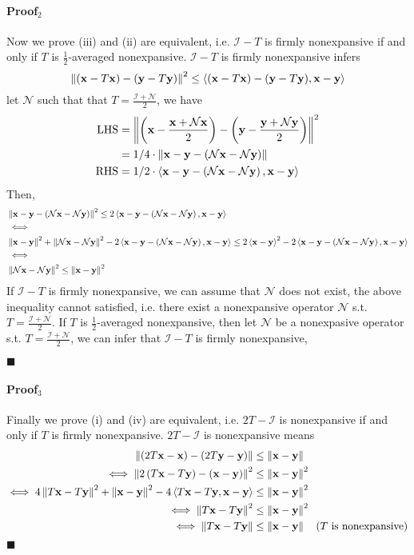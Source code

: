 \documentclass[11pt]{article}
\def\ny{\mathcal N \bold y}
\def\nx{\mathcal N \bold x}
\def\bx{\bold x}
\def\by{\bold y}
\def\tx{T \bold x}
\def\ty{T \bold y}
\newcommand\norm[1]{\left\lVert#1\right\rVert}
\newcommand\vc[1]{\left\langle{#1}\right\rangle }
\newcommand*{\QEDA}{\hfill\ensuremath{\blacksquare}}
\newcommand\bra[1]{\left( #1 \right)}
\def \xy{\norm{\bx - \by}^2}
\def \txty{\norm{\tx  - \ty}^2}
\def \tt{\tx - \ty}
\def \xx{\bx - \by}
\begin{document}
\paragraph{Proof$_2$} Now we prove (iii) and (ii) are equivalent, i.e. $\mathcal I- T$ is firmly nonexpansive if and only if   $T$ is $\frac{1}{2}$-averaged nonexpansive.  $\mathcal I- T$  is firmly nonexpansive infers
$$
\norm{(\bx - \tx) - (\by - \ty)} ^ 2 \leq \vc{(\bx - \tx) - (\by - \ty), \bx - \by}
$$
let $\mathcal N$ such that that $T = \frac{\mathcal I + \mathcal N }{2}$, we have
$$
\begin{aligned}
	\text{LHS}&=\norm{\bra{\bx - \frac{\bx + \nx}{2} } - \bra{\by - \frac{\by + \ny}{2}}}^2\\
	&= 1/4 \cdot \norm {\bx - \by - \bra{\nx - \ny}}\\
	\text{RHS}&= 1/2 \cdot \vc{\bx - \by - \bra {\nx - \ny},\bx - \by}
\end{aligned}
$$
Then,
$$
 \begin{aligned}
 	&\norm {\bx - \by - \bra{\nx - \ny}}^2  \leq  2 \vc{\bx - \by - \bra {\nx - \ny},\bx - \by} \\
 	&\iff  \\
 	 &\norm{\bx - \by}^2  + \norm{\nx - \ny}^2  - 2 \vc{\bx - \by - \bra {\nx - \ny},\bx - \by} \leq  2 \vc{\bx - \by}^2 - 2 \vc{\bx - \by - \bra {\nx - \ny},\bx - \by} \\
 	& \iff \\
 	& \norm{\nx - \ny}^2 \leq  \xy 
 \end{aligned}
$$
If  $\mathcal I- T$ is firmly nonexpansive, we can assume that $\mathcal N$ does not exist, the above inequality cannot satisfied, i.e. there exist a nonexpansive operator $\mathcal N$ s.t.  $T = \frac{\mathcal I + \mathcal N }{2}$. If  $T$ is $\frac{1}{2}$-averaged nonexpansive, then let $\mathcal N$ be a nonexpasive operator s.t. $T = \frac{\mathcal I + \mathcal N }{2}$, we can infer that  $\mathcal I- T$ is firmly nonexpansive,

\QEDA
\paragraph{Proof$_3$} Finally we prove (i) and (iv) are equivalent, i.e. $2 T-\mathcal{I}$ is nonexpansive if and only if  $T$ is firmly nonexpansive. $2 T-\mathcal{I}$ is nonexpansive means 
$$
\begin{aligned}
	\norm{\bra{2\tx  - \bx}- \bra {2\ty  - \by}} &\leq  \norm{\bx - \by}\\
	\iff \norm{2\bra{\tx - \ty} - \bra{\bx - \by}}^2 &\leq \xy\\
	\iff 4 \txty  + \xy- 4 \vc{\tt,\xx} &\leq \xy \\
	\iff \txty &\leq \xy \\
	\iff \norm{\tt} &\leq \norm{\bx - \by}\quad \text{($T$ is nonexpansive)}
\end{aligned}
$$
\QEDA
\end{document}
